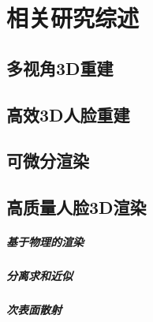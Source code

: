\chapter{相关研究综述}
\label{chap:related_work}

\section{多视角3D重建}

\section{高效3D人脸重建}

\section{可微分渲染}

\section{高质量人脸3D渲染}

\paragraph{基于物理的渲染}

\paragraph{分离求和近似}

\paragraph{次表面散射}
